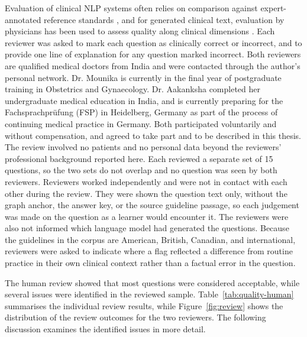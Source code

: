 Evaluation of clinical NLP systems often relies on comparison against
expert-annotated reference standards \cite{uzuner2011}, and for
generated clinical text, evaluation by physicians has been used to assess
quality along clinical dimensions \cite{singhal2025}.
Each reviewer was asked to mark each question as clinically correct or
incorrect, and to provide one line of explanation for any question marked
incorrect. Both reviewers are qualified medical doctors from India and were contacted through the author's personal network. Dr. Mounika is currently in the final year of postgraduate training in Obstetrics and Gynaecology. Dr. Aakanksha completed her undergraduate medical education in India, and is currently preparing for the Fachsprachprüfung (FSP) in Heidelberg, Germany as part of the process of continuing medical practice in Germany. Both participated voluntarily and without compensation, and agreed to take part and to be described in this thesis. The review involved no patients and no personal data beyond the reviewers' professional background reported here. Each reviewed a separate set of 15 questions, so the
two sets do not overlap and no question was seen by both reviewers. Reviewers
worked independently and were not in contact with each other during the
review. They were shown the question text only, without the graph anchor, the
answer key, or the source guideline passage, so each judgement was made on the
question as a learner would encounter it. The reviewers were also not informed which language model had generated the questions. Because the guidelines in the corpus are American, British, Canadian, and international, reviewers were asked to indicate where a flag reflected a difference from routine practice in their own clinical context rather than a factual error in the question.

The human review showed that most questions were considered acceptable, while several issues were identified in the reviewed sample. Table~\ref{tab:quality-human} summarises the individual review results, while Figure~\ref{fig:review} shows the distribution of the review outcomes for the two reviewers. The following discussion examines the identified issues in more detail.


